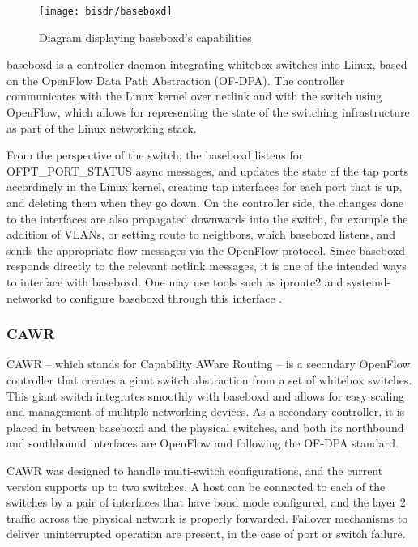 \begin{figure} [!htbp]
    \centering
    \texttt{[image: bisdn/baseboxd]}
    \caption{Diagram displaying baseboxd's capabilities}
\end{figure}

baseboxd is a controller daemon integrating whitebox switches into Linux, based on the OpenFlow Data Path Abstraction (OF-DPA). The controller communicates with the Linux kernel over netlink and with the switch using OpenFlow, which allows for 
representing the state of the switching infrastructure as part of the Linux networking stack. 

\par From the perspective of the switch, the baseboxd listens for OFPT\_PORT\_STATUS async messages, and updates the state of the tap ports accordingly in the Linux kernel, creating tap interfaces for each port that is up, and deleting them when they go down. 
On the controller side, the changes done to the interfaces are also propagated downwards into the switch, for example the addition of VLANs, or setting route to neighbors, which baseboxd listens, and sends the appropriate flow messages via the OpenFlow protocol. 
Since baseboxd responds directly to the relevant netlink messages, it is one of the intended ways to interface with baseboxd. One may use tools such as iproute2 and systemd-networkd to configure baseboxd through this interface \cite{CITE - docs.bisdn.de}.


\subsubsection {CAWR}

CAWR – which stands for Capability AWare Routing – is a secondary OpenFlow controller that creates a giant switch abstraction from a set of whitebox switches. This giant switch integrates smoothly with baseboxd and allows for easy scaling and management of mulitple
networking devices. As a secondary controller, it is placed in between baseboxd and the physical switches, and both its northbound and southbound interfaces are OpenFlow and following the OF-DPA standard.

\par CAWR was designed to handle multi-switch configurations, and the current version supports up to two switches. A host can be connected to each of the switches by a pair of interfaces that have bond mode configured, and the layer 2 traffic across
the physical network is properly forwarded. Failover mechanisms to deliver uninterrupted operation are present, in the case of port or switch failure.

